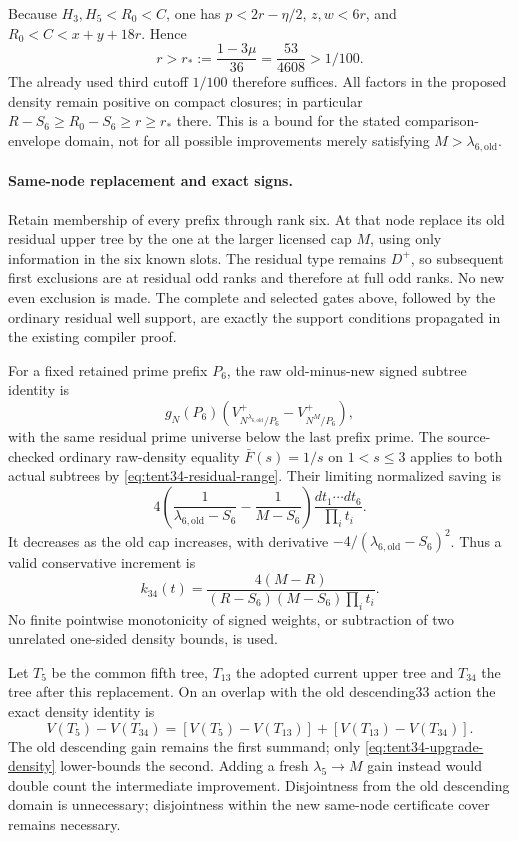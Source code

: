 Because $H_3,H_5<R_0<C$, one has
$p<2r-\eta/2$, $z,w<6r$, and
$R_0<C<x+y+18r$. Hence
\[
 r>r_*:=\frac{1-3\mu}{36}=\frac{53}{4608}>1/100.
\]
The already used third cutoff $1/100$ therefore suffices. All
factors in the proposed density remain positive on compact closures;
in particular $R-S_6\ge R_0-S_6\ge r\ge r_*$ there. This is a
bound for the stated comparison-envelope domain, not for all
possible improvements merely satisfying $M>\lambda_{6,\mathrm{old}}$.

\paragraph{Same-node replacement and exact signs.}
Retain membership of every prefix through rank six. At that node
replace its old residual upper tree by the one at the larger
licensed cap $M$, using only information in the six known slots.
The residual type remains $D^+$, so subsequent first exclusions
are at residual odd ranks and therefore at full odd ranks. No new
even exclusion is made. The complete and selected gates above,
followed by the ordinary residual well support, are exactly the
support conditions propagated in the existing compiler proof.

For a fixed retained prime prefix $P_6$, the raw old-minus-new
signed subtree identity is
\[
 g_N(P_6)\left(V^+_{N^{\lambda_{6,\mathrm{old}}}/P_6}
                  -V^+_{N^M/P_6}\right),
\]
with the same residual prime universe below the last prefix prime.
The source-checked ordinary raw-density equality
$\bar F(s)=1/s$ on $1<s\le3$ applies to both actual subtrees by
\eqref{eq:tent34-residual-range}. Their limiting normalized saving is
\[
 4\left(\frac1{\lambda_{6,\mathrm{old}}-S_6}
                -\frac1{M-S_6}\right)
                 \frac{dt_1\cdots dt_6}{\prod_i t_i}.
\]
It decreases as the old cap increases, with derivative
$-4/(\lambda_{6,\mathrm{old}}-S_6)^2$. Thus a valid conservative
increment is
\begin{equation}\label{eq:tent34-upgrade-density}
 k_{34}(t)=\frac{4(M-R)}{(R-S_6)(M-S_6)\prod_i t_i}.
\end{equation}
No finite pointwise monotonicity of signed weights, or subtraction
of two unrelated one-sided density bounds, is used.

Let $T_5$ be the common fifth tree, $T_{13}$ the adopted current
upper tree and $T_{34}$ the tree after this replacement. On an
overlap with the old descending33 action the exact density identity
is
\[
 V(T_5)-V(T_{34})=
 [V(T_5)-V(T_{13})]+[V(T_{13})-V(T_{34})].
\]
The old descending gain remains the first summand; only
\eqref{eq:tent34-upgrade-density} lower-bounds the second. Adding
a fresh $\lambda_5\to M$ gain instead would double count the
intermediate improvement. Disjointness from the old descending
domain is unnecessary; disjointness within the new same-node
certificate cover remains necessary.

